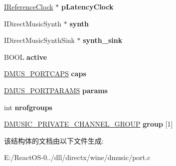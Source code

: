 \begin{DoxyCompactItemize}
\item 
\mbox{\label{struct_synth_port_impl_a4c333ab0f2053d2c23cfe668f9b93266}} 
\hyperlink{interface_i_reference_clock}{I\+Reference\+Clock} $\ast$ {\bfseries p\+Latency\+Clock}
\item 
\mbox{\label{struct_synth_port_impl_a4c7803258ae74bd230f8da28e7ea9d4a}} 
I\+Direct\+Music\+Synth $\ast$ {\bfseries synth}
\item 
\mbox{\label{struct_synth_port_impl_ab21c9c493c49c8347cc6a59a642dad61}} 
I\+Direct\+Music\+Synth\+Sink $\ast$ {\bfseries synth\+\_\+sink}
\item 
\mbox{\label{struct_synth_port_impl_af93dcdf747e4482ea2d419f9fd9b9050}} 
B\+O\+OL {\bfseries active}
\item 
\mbox{\label{struct_synth_port_impl_acb1b83a5d03876b1123a741b8f68456a}} 
\hyperlink{struct___d_m_u_s___p_o_r_t_c_a_p_s}{D\+M\+U\+S\+\_\+\+P\+O\+R\+T\+C\+A\+PS} {\bfseries caps}
\item 
\mbox{\label{struct_synth_port_impl_a859328faadd9da059908a4de1490f712}} 
\hyperlink{struct___d_m_u_s___p_o_r_t_p_a_r_a_m_s8}{D\+M\+U\+S\+\_\+\+P\+O\+R\+T\+P\+A\+R\+A\+MS} {\bfseries params}
\item 
\mbox{\label{struct_synth_port_impl_a58c4f4d482e087d686916306c8132994}} 
int {\bfseries nrofgroups}
\item 
\mbox{\label{struct_synth_port_impl_a5fa4b532f88fc1a24b8e4205e12c9f0a}} 
\hyperlink{struct_d_m_u_s_i_c___p_r_i_v_a_t_e___c_h_a_n_n_e_l___g_r_o_u_p__}{D\+M\+U\+S\+I\+C\+\_\+\+P\+R\+I\+V\+A\+T\+E\+\_\+\+C\+H\+A\+N\+N\+E\+L\+\_\+\+G\+R\+O\+UP} {\bfseries group} \mbox{[}1\mbox{]}
\end{DoxyCompactItemize}


该结构体的文档由以下文件生成\+:\begin{DoxyCompactItemize}
\item 
E\+:/\+React\+O\+S-\/0../dll/directx/wine/dmusic/port.\+c\end{DoxyCompactItemize}
